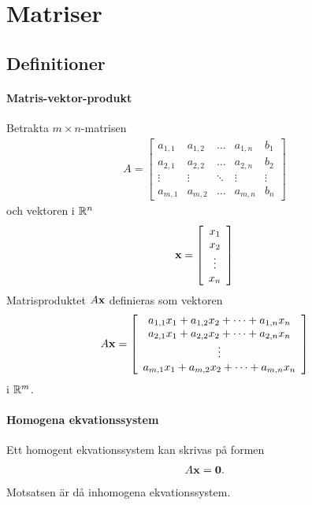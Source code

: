 \section{Matriser}

\subsection{Definitioner}

\paragraph{Matris-vektor-produkt}
Betrakta $m\times n$-matrisen
\begin{align*}
	A =
	\left[\begin{array}{cccc|c}
    	a_{1,1} & a_{1,2} & \dots  & a_{1,n} & b_1 \\
    	a_{2,1} & a_{2,2} & \dots  & a_{2,n} & b_2 \\
    	\vdots  & \vdots  & \ddots & \vdots  & \vdots \\
	    a_{m,1} & a_{m,2} & \dots  & a_{m,n} & b_n
	\end{array}\right]
\end{align*}
och vektoren i $\mathbb{R}^n$
\begin{align*}
	\vectorbold{x} =
	\left[\begin{array}{c}
    	x_1    \\
    	x_2    \\
    	\vdots \\
	    x_n
	\end{array}\right]
\end{align*}
Matrisproduktet $A\vectorbold{x}$ definieras som vektoren
\begin{align*}
	A\vectorbold{x} =
	\left[\begin{array}{c}
    	a_{1,1}x_1 + a_{1,2}x_2 + \dots + a_{1,n}x_n \\
    	a_{2,1}x_1 + a_{2,2}x_2 + \dots + a_{2,n}x_n \\
    	\vdots                                       \\
	    a_{m,1}x_1 + a_{m,2}x_2 + \dots + a_{m,n}x_n
	\end{array}\right]
\end{align*}
i $\mathbb{R}^m$.

\paragraph{Homogena ekvationssystem}
Ett homogent ekvationssystem kan skrivas på formen
\begin{align*}
	A\vect{x} = \vect{0}.
\end{align*}
Motsatsen är då inhomogena ekvationssystem.

